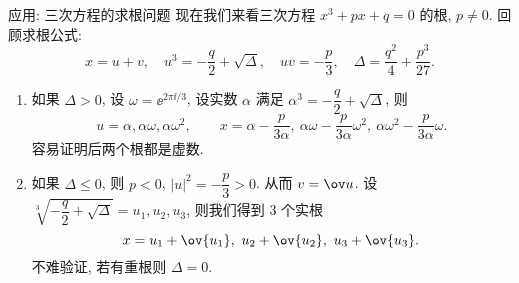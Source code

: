 \begin{frame}{应用: 三次方程的求根问题\noexer}
	\onslide<+->
	现在我们来看三次方程 $x^3+px+q=0$ 的根, $p\neq 0$.
	\onslide<+->
	回顾求根公式:
	\[x=u+v,\quad u^3=-\frac q2+\sqrt{\Delta},\quad uv=-\frac p3,\quad \Delta=\frac{q^2}4+\frac{p^3}{27}.
	\]
	\vspace{-\baselineskip}
	\begin{enumerate}
		\item 如果 $\Delta>0$, 设 $\omega=\ee^{2\pi\ii/3}$, 设实数 $\alpha$ 满足 $\alpha^3=-\dfrac q2+\sqrt{\Delta}$,
			\onslide<+->
			则
				\[
					u=\alpha,\alpha\omega,\alpha\omega^2,\qquad
					x=\alpha-\frac p{3\alpha},\ 
						\alpha\omega-\frac p{3\alpha} \omega^2,\ 
						\alpha\omega^2-\frac p{3\alpha} \omega.
				
	\]
			\onslide<+->
			容易证明后两个根都是虚数.
		\item 如果 $\Delta\le 0$, 则 $p<0$, $|u|^2=-\dfrac p3>0$. 
			\onslide<+->
			从而 $v=\ov u$.
			\onslide<+->
			设 $\sqrt[3]{-\dfrac q2+\sqrt{\Delta}}=u_1,u_2,u_3$,
			\onslide<+->
			则我们得到 $3$ 个实根
				\[x=u_1+\ov{u_1},\ u_2+\ov{u_2},\ u_3+\ov{u_3}.
	\]
			\onslide<+->
			不难验证, 若有重根则 $\Delta=0$.
	\end{enumerate}
\end{frame}

